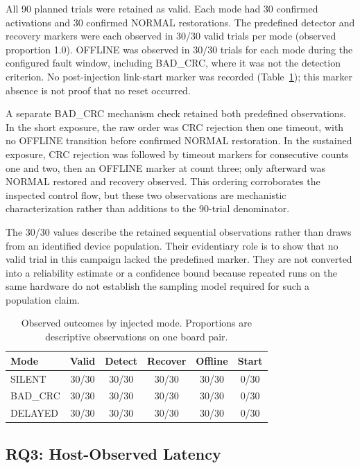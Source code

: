 \documentclass[conference]{IEEEtran}
\begin{document}
All 90 planned trials were retained as valid. Each mode had 30 confirmed activations and 30 confirmed NORMAL restorations. The predefined detector and recovery markers were each observed in 30/30 valid trials per mode (observed proportion 1.0). OFFLINE was observed in 30/30 trials for each mode during the configured fault window, including BAD\_CRC, where it was not the detection criterion. No post-injection link-start marker was recorded (Table~\ref{tab:outcomes}); this marker absence is not proof that no reset occurred.

A separate BAD\_CRC mechanism check retained both predefined observations. In the short exposure, the raw order was CRC rejection then one timeout, with no OFFLINE transition before confirmed NORMAL restoration. In the sustained exposure, CRC rejection was followed by timeout markers for consecutive counts one and two, then an OFFLINE marker at count three; only afterward was NORMAL restored and recovery observed. This ordering corroborates the inspected control flow, but these two observations are mechanistic characterization rather than additions to the 90-trial denominator.

The 30/30 values describe the retained sequential observations rather than draws from an identified device population. Their evidentiary role is to show that no valid trial in this campaign lacked the predefined marker. They are not converted into a reliability estimate or a confidence bound because repeated runs on the same hardware do not establish the sampling model required for such a population claim.

\begin{table}[t]
\caption{Observed outcomes by injected mode. Proportions are descriptive observations on one board pair.}
\label{tab:outcomes}
\centering
\footnotesize
\begin{tabular}{lccccc}
\toprule
Mode & Valid & Detect & Recover & Offline & Start \\
\midrule
SILENT   & 30/30 & 30/30 & 30/30 & 30/30 & 0/30 \\
BAD\_CRC  & 30/30 & 30/30 & 30/30 & 30/30 & 0/30 \\
DELAYED  & 30/30 & 30/30 & 30/30 & 30/30 & 0/30 \\
\bottomrule
\end{tabular}
\end{table}

\subsection{RQ3: Host-Observed Latency}
\end{document}

